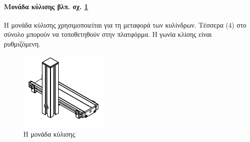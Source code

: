 \documentclass[a4paper,12pt,twoside]{report}
\begin{document}
{				\paragraph{Μονάδα κύλισης {\footnotesize βλπ. σχ. \ref{φωτ:Η μονάδα κύλισης από Festo}} } {Η μονάδα κύλισης χρησιμοποιείται για τη μεταφορά των κυλίνδρων. Τέσσερα (4) στο σύνολο μπορούν να τοποθετηθούν στην πλατφόρμα. Η γωνία κλίσης είναι ρυθμιζόμενη.
				}
				\begin{figure}[hp]
					\centering
					\includegraphics[scale=1]{TestingStationSlideModule.png}
					\caption{Η μονάδα κύλισης \cite{FestoMPSTestingStationManual}}
					\label{φωτ:Η μονάδα κύλισης από Festo}
				\end{figure}
				
				
}
\end{document}
